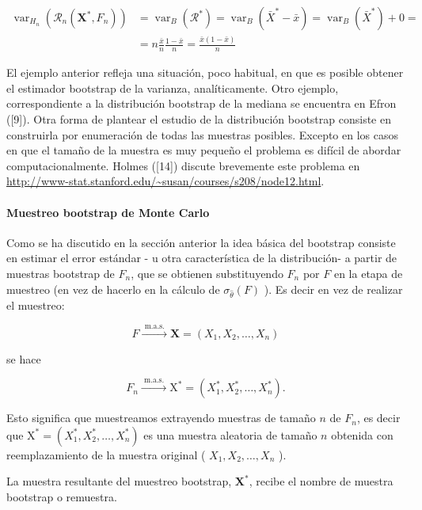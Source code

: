 \documentclass[
]{article}
\begin{document}
\[
\begin{aligned}
\operatorname{var}_{H_{n}}\left(\mathcal{R}_{n}\left(\mathbf{X}^{*}, F_{n}\right)\right) & =\operatorname{var}_{B}\left(\mathcal{R}^{*}\right)=\operatorname{var}_{B}\left(\bar{X}^{*}-\bar{x}\right)=\operatorname{var}_{B}\left(\bar{X}^{*}\right)+0= \\
& =n \frac{\bar{x}}{n} \frac{1-\bar{x}}{n}=\frac{\bar{x}(1-\bar{x})}{n}
\end{aligned}
\]

El ejemplo anterior refleja una situación, poco habitual, en que es posible obtener el estimador bootstrap de la varianza, analíticamente. Otro ejemplo, correspondiente a la distribución bootstrap de la mediana se encuentra en Efron ({[}9{]}). Otra forma de plantear el estudio de la distribución bootstrap consiste en construirla por enumeración de todas las muestras posibles. Excepto en los casos en que el tamaño de la muestra es muy pequeño el problema es difícil de abordar computacionalmente. Holmes ({[}14{]}) discute brevemente este problema en \url{http://www-stat.stanford.edu/~susan/courses/s208/node12.html}.

\paragraph{Muestreo bootstrap de Monte Carlo}\label{muestreo-bootstrap-de-monte-carlo}

Como se ha discutido en la sección anterior la idea básica del bootstrap consiste en estimar el error estándar - u otra característica de la distribución-
a partir de muestras bootstrap de \(F_{n}\), que se obtienen substituyendo \(F_{n}\) por \(F\) en la etapa de muestreo (en vez de hacerlo en la cálculo de \(\sigma_{\hat{\theta}}(F)\) ). Es decir en vez de realizar el muestreo:

\[
F \xrightarrow{\text { m.a.s. }} \mathbf{X}=\left(X_{1}, X_{2}, \ldots, X_{n}\right)
\]

se hace

\[
F_{n} \xrightarrow{\text { m.a.s. }} \mathrm{X}^{*}=\left(X_{1}^{*}, X_{2}^{*}, \ldots, X_{n}^{*}\right) .
\]

Esto significa que muestreamos extrayendo muestras de tamaño \(n\) de \(F_{n}\), es decir que \(\mathrm{X}^{*}=\left(X_{1}^{*}, X_{2}^{*}, \ldots, X_{n}^{*}\right)\) es una muestra aleatoria de tamaño \(n\) obtenida con reemplazamiento de la muestra original ( \(X_{1}, X_{2}, \ldots, X_{n}\) ).

La muestra resultante del muestreo bootstrap, \(\mathbf{X}^{*}\), recibe el nombre de muestra bootstrap o remuestra.
\end{document}
